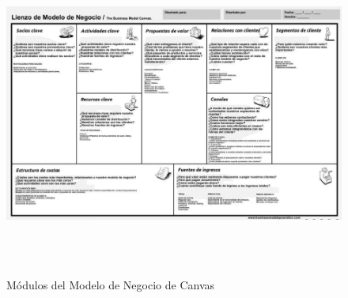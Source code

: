 \documentclass[preprint,12pt]{elsarticle}
\begin{document}
\begin{figure}[htb]
		\begin{center}
			\includegraphics[height=10cm]{./IMAGENES/modeloCanvas2} 
			\caption{Módulos del Modelo de Negocio de Canvas}  \cite{referenciasosa2} 
		\end{center}
	\end{figure}
\end{document}

